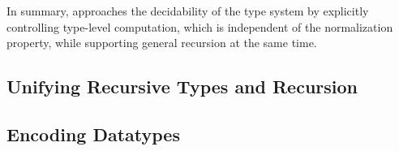 In summary, \name approaches the decidability of the type system by explicitly controlling type-level computation, which is independent of the normalization property, while supporting general recursion at the same time.

\subsection{Unifying Recursive Types and Recursion}


\subsection{Encoding Datatypes}


